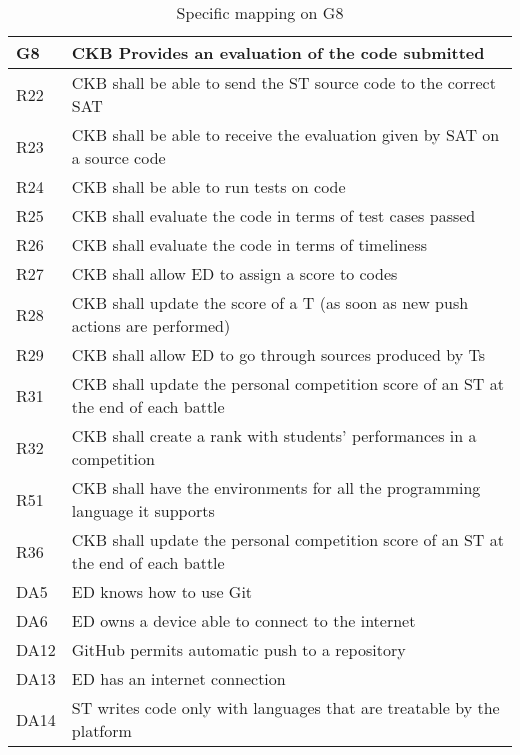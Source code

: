   \begin{table}[H]
    \begin{longtable}{|l|p{12cm}|}
      \hline
      \textbf{G8} & \textbf{CKB Provides an evaluation of the code submitted}      \\
      \hline
      R22 & CKB shall be able to send the ST source code to the correct SAT \\
      \hline
      R23 & CKB shall be able to receive the evaluation given by SAT on a source code \\
      \hline
      R24 & CKB shall be able to run tests on code \\
      \hline
      R25 & CKB shall evaluate the code in terms of test cases passed \\
      \hline
      R26 & CKB shall evaluate the code in terms of timeliness \\
      \hline
      R27 & CKB shall allow ED to assign a score to codes \\
      \hline
      R28 & CKB shall update the score of a T (as soon as new push actions are performed) \\
      \hline
      R29 & CKB shall allow ED to go through sources produced by Ts \\
      \hline
      R31 & CKB shall update the personal competition score of an ST at the end of each battle \\
      \hline
      R32 & CKB shall create a rank with students' performances in a competition \\
      \hline
      R51 & CKB shall have the environments for all the programming language it supports \\
      \hline
      R36 & CKB shall update the personal competition score of an ST at the end of each battle \\
      \hline
      DA5 & ED knows how to use Git \\
      \hline
      DA6 & ED owns a device able to connect to the internet \\
      \hline
      DA12 & GitHub permits automatic push to a repository \\
      \hline
      DA13 & ED has an internet connection \\
      \hline
      DA14 & ST writes code only with languages that are treatable by the platform \\
      \hline
    \end{longtable}
    \caption{Specific mapping on G8}
    \label{tab:mappingG8}
  \end{table}

